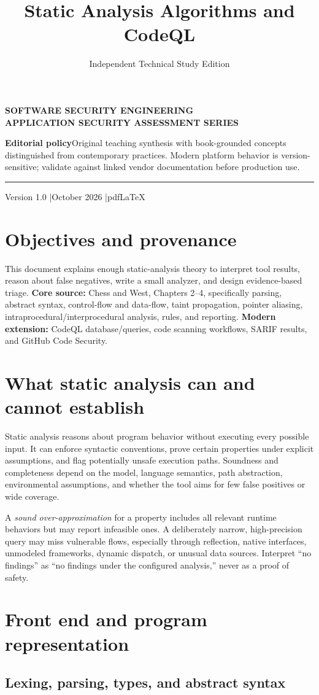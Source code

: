 \documentclass[
  letterpaper,
]{article}
\title{Static Analysis Algorithms and CodeQL}
\author{Independent Technical Study Edition}
\date{}
\makeatletter
\renewcommand{\maketitle}{%
 \hypersetup{pageanchor=false}%
\begin{titlepage}\thispagestyle{empty}
 \vspace*{1.5cm}{\color{brand}\rule{\textwidth}{3pt}}\par\vspace{1cm}
 {\sffamily\bfseries\color{muted}\large SOFTWARE SECURITY ENGINEERING\\ APPLICATION SECURITY ASSESSMENT SERIES}\par\vspace{1.05cm}
 {\sffamily\bfseries\color{ink}\fontsize{27}{34}\selectfont\@title\par}\vspace{0.8cm}
 {\sffamily\large\color{brand}\@author\par}\vfill
 \begin{tcolorbox}[colback=brandlight,colframe=brand!55,boxrule=0.5pt]
 \small\textbf{Editorial policy}\quad Original teaching synthesis with book-grounded concepts distinguished from contemporary practices. Modern platform behavior is version-sensitive; validate against linked vendor documentation before production use.
 \end{tcolorbox}
 {\color{brand}\rule{\textwidth}{2pt}}\par\vspace{0.3cm}
 {\sffamily\small Version 1.0 \quad|\quad October 2026 \quad|\quad pdfLaTeX}\end{titlepage}\hypersetup{pageanchor=true}\setcounter{page}{1}}
\makeatother
\begin{document}
\maketitle

{
\setcounter{tocdepth}{3}
\tableofcontents
}
\section{Objectives and provenance}\label{objectives-and-provenance}

This document explains enough static-analysis theory to interpret tool
results, reason about false negatives, write a small analyzer, and
design evidence-based triage. \textbf{Core source:} Chess and West,
Chapters 2--4, specifically parsing, abstract syntax, control-flow and
data-flow, taint propagation, pointer aliasing,
intraprocedural/interprocedural analysis, rules, and reporting.
\textbf{Modern extension:} CodeQL database/queries, code scanning
workflows, SARIF results, and GitHub Code Security.

\section{What static analysis can and cannot
establish}\label{what-static-analysis-can-and-cannot-establish}

Static analysis reasons about program behavior without executing every
possible input. It can enforce syntactic conventions, prove certain
properties under explicit assumptions, and flag potentially unsafe
execution paths. Soundness and completeness depend on the model,
language semantics, path abstraction, environmental assumptions, and
whether the tool aims for few false positives or wide coverage.

A \emph{sound over-approximation} for a property includes all relevant
runtime behaviors but may report infeasible ones. A deliberately narrow,
high-precision query may miss vulnerable flows, especially through
reflection, native interfaces, unmodeled frameworks, dynamic dispatch,
or unusual data sources. Interpret ``no findings'' as ``no findings
under the configured analysis,'' never as a proof of safety.

\section{Front end and program
representation}\label{front-end-and-program-representation}

\subsection{Lexing, parsing, types, and abstract
syntax}\label{lexing-parsing-types-and-abstract-syntax}
\end{document}
